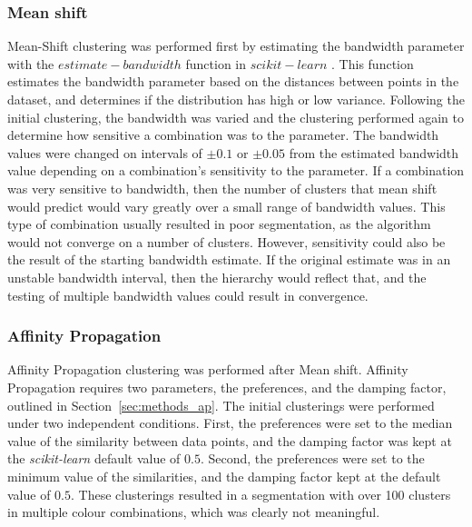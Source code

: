 \subsubsection{Mean shift}
Mean-Shift clustering was performed first by estimating the bandwidth parameter with the $estimate-bandwidth$ function in $scikit-learn$ \citep{sklearn}.
This function estimates the bandwidth parameter based on the distances between points in the dataset, and determines if the distribution has high or low variance.
Following the initial clustering, the bandwidth was varied and the clustering performed again to determine how sensitive a combination was to the parameter. 
The bandwidth values were changed on intervals of $\pm 0.1$ or $\pm 0.05$ from the estimated bandwidth value depending on a combination's sensitivity to the parameter. 
If a combination was very sensitive to bandwidth, then the number of clusters that mean shift would predict would vary greatly over a small range of bandwidth values.
This type of combination usually resulted in poor segmentation, as the algorithm would not converge on a number of clusters. 
However, sensitivity could also be the result of the starting bandwidth estimate.
If the original estimate was in an unstable bandwidth interval, then the hierarchy would reflect that, and the testing of multiple bandwidth values could result in convergence.

\subsubsection{Affinity Propagation}
Affinity Propagation clustering was performed after Mean shift.
Affinity Propagation requires two parameters, the preferences, and the damping factor, outlined in Section~\ref{sec:methods_ap}.
The initial clusterings were performed under two independent conditions.
First, the preferences were set to the median value of the similarity between data points, and the damping factor was kept at the \textit{scikit-learn} default value of $0.5$.
Second, the preferences were set to the minimum value of the similarities, and the damping factor kept at the default value of $0.5$.
These clusterings resulted in a segmentation with over 100 clusters in multiple colour combinations, which was clearly not meaningful.

